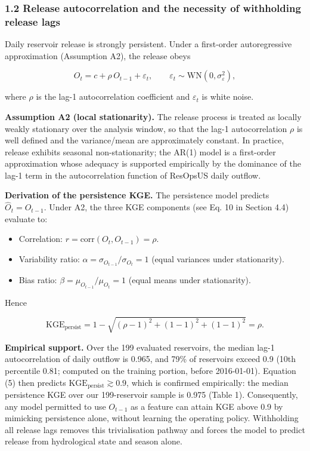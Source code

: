 \documentclass[journal]{ascelike-new}
\begin{document}
\subsubsection{1.2 Release autocorrelation and the necessity of withholding release lags}


Daily reservoir release is strongly persistent. Under a first-order autoregressive approximation (Assumption A2), the release obeys


\begin{equation}O_t = c + \rho\, O_{t-1} + \varepsilon_t, \qquad \varepsilon_t \sim \text{WN}(0, \sigma_\varepsilon^2), \tag{4}\end{equation}


where $\rho$ is the lag-1 autocorrelation coefficient and $\varepsilon_t$ is white noise.


\textbf{Assumption A2 (local stationarity).} The release process is treated as locally weakly stationary over the analysis window, so that the lag-1 autocorrelation $\rho$ is well defined and the variance/mean are approximately constant. In practice, release exhibits seasonal non-stationarity; the AR(1) model is a first-order approximation whose adequacy is supported empirically by the dominance of the lag-1 term in the autocorrelation function of ResOpsUS daily outflow.


\textbf{Derivation of the persistence KGE.} The persistence model predicts $\hat{O}_t = O_{t-1}$. Under A2, the three KGE components (see Eq. 10 in Section 4.4) evaluate to:


\begin{itemize}
  \item Correlation: $r = \text{corr}(O_t, O_{t-1}) = \rho$.
  \item Variability ratio: $\alpha = \sigma_{O_{t-1}} / \sigma_{O_t} = 1$ (equal variances under stationarity).
  \item Bias ratio: $\beta = \mu_{O_{t-1}} / \mu_{O_t} = 1$ (equal means under stationarity).
\end{itemize}


Hence


\begin{equation}\text{KGE}_{\text{persist}} = 1 - \sqrt{(\rho - 1)^2 + (1-1)^2 + (1-1)^2} = \rho. \tag{5}\end{equation}


\textbf{Empirical support.} Over the 199 evaluated reservoirs, the median lag-1 autocorrelation of daily outflow is 0.965, and 79\% of reservoirs exceed 0.9 (10th percentile 0.81; computed on the training portion, before 2016-01-01). Equation (5) then predicts $\text{KGE}_{\text{persist}} \gtrsim 0.9$, which is confirmed empirically: the median persistence KGE over our 199-reservoir sample is 0.975 (Table 1). Consequently, any model permitted to use $O_{t-1}$ as a feature can attain KGE above 0.9 by mimicking persistence alone, without learning the operating policy. Withholding all release lags removes this trivialisation pathway and forces the model to predict release from hydrological state and season alone.
\end{document}
